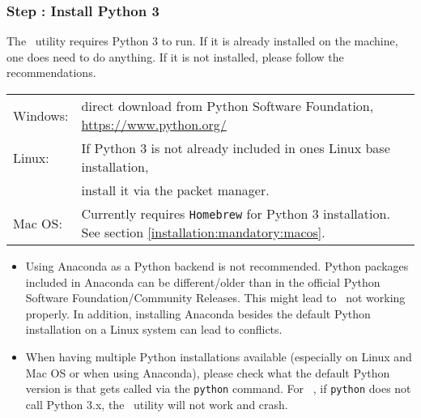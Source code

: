		
		\newpage
		\subsubsection{Step \thestep: Install Python 3}
			The \productName~utility requires Python 3 to run. If it is already installed on the machine, one does need to do anything. If it is not installed, please follow the recommendations. 
			\begin{longtable}[c]{ll}
				\rowcolor{white}
				\multicolumn{2}{l}{\textbf{Recommendation:}}\\
				\midrule
				\endfirsthead
				Windows: & direct download from Python Software Foundation, \href{https://www.python.org/}{https://www.python.org/}\\
				Linux: & If Python 3 is not already included in ones Linux base installation,\\
				\rowcolor{white}
				& install it via the packet manager. \\
				\rowcolor{tableRowHighlightColor}
				Mac OS: & Currently requires \lstinline$Homebrew$ for Python 3 installation. See section \ref{installation:mandatory:macos}.\\
				\midrule
			\end{longtable}
			
			\begin{daWarningBox}
				\begin{itemize}[leftmargin=*]
					\setlength\itemsep{-0.1em}
					\item Using Anaconda as a Python backend is not recommended. Python packages included in Anaconda can be different/older than in the official Python Software Foundation/Community Releases. This might lead to \productName~not working properly. In addition, installing Anaconda besides the default Python installation on a Linux system can lead to conflicts.
					\item When having multiple Python installations available (especially on Linux and Mac OS or when using Anaconda), please check what the default Python version is that gets called via the \lstinline{python} command. For \productName~\productVersion, if \lstinline{python} does not call Python 3.x, the \productName~utility will not work and crash.
				\end{itemize}
			\end{daWarningBox}
			
		
